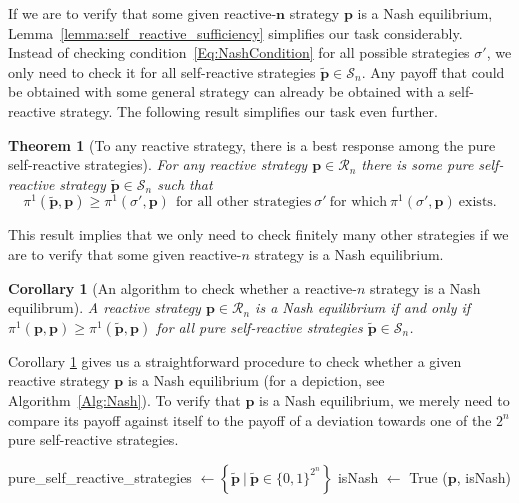 \documentclass[11pt]{article}
\theoremstyle{plainCl1}
\newtheorem{theorem}{Theorem}
\newtheorem{corollary}{Corollary}
\theoremstyle{plainCl2}
\begin{document}
\noindent
If we are to verify that some given reactive-$\mathbf{n}$ strategy $\mathbf{p}$ is a Nash equilibrium, Lemma~\ref{lemma:self_reactive_sufficiency} simplifies our task considerably. 
Instead of checking condition~\eqref{Eq:NashCondition} for all possible strategies $\sigma'$, we only need to check it for all self-reactive strategies $\mathbf{\tilde{p}}\!\in\! \mathcal{S}_n$. 
Any payoff that could be obtained with some general strategy can already be obtained with a self-reactive strategy. 
The following result simplifies our task even further. 

\begin{theorem}[To any reactive strategy, there is a best response among the pure self-reactive strategies]
\label{lemma:nash_against_pure_self_reactive} 
For any reactive strategy $\mathbf{p}\!\in\!\mathcal{R}_n$ there is some pure self-reactive strategy $\mathbf{\tilde p}\!\in\!\mathcal{S}_n$ such that 
 \begin{equation} \label{Eq:BRSelfReactive}
\pi^1(\mathbf{\tilde p},\mathbf{p}) \!\ge\! \pi^1(\sigma',\mathbf{p}) ~~\text{for all other strategies}~\sigma'~\text{for which}~ \pi^1(\sigma',\mathbf{p})~\text{exists}. 
\end{equation}
\end{theorem}

\noindent
This result implies that we only need to check finitely many other strategies if we are to verify that some given reactive-$n$ strategy is a Nash equilibrium. 

\begin{corollary}[An algorithm to check whether a reactive-$n$ strategy is a Nash equilibrum]
\label{Cor:NashCondition}
A reactive strategy $\mathbf{p}\!\in\!\mathcal{R}_n$ is a Nash equilibrium if and only if $\pi^1(\mathbf{p},\mathbf{p}) \!\ge\! \pi^1(\mathbf{\tilde p},\mathbf{p})$ for all pure self-reactive strategies $\mathbf{\tilde p}\!\in\!\mathcal{S}_n$. 
\end{corollary}

\noindent
Corollary \ref{Cor:NashCondition} gives us a straightforward procedure to check whether a given reactive strategy $\mathbf{p}$ is a Nash equilibrium (for a depiction, see Algorithm~\ref{Alg:Nash}). To verify that $\mathbf{p}$ is a Nash equilibrium, we merely need to compare its payoff against itself to the payoff of a deviation towards one of the $2^n$ pure self-reactive strategies.\\

\begin{algorithm}[t!]
      pure\_self\_reactive\_strategies $\gets \left\{ \mathbf{\tilde{p}} ~\big|~ \mathbf{\tilde{p}} \in \{0, 1\}^{2 ^ n} \right\}$ \;
      isNash $\gets$ True \; 
      \Return (\(\mathbf{p}\), isNash) \;
  \caption{An algorithm to verify whether a given reactive strategy~$\mathbf{p}$ is a Nash equilibrium.}
  \label{Alg:Nash}
\end{algorithm}
\end{document}
